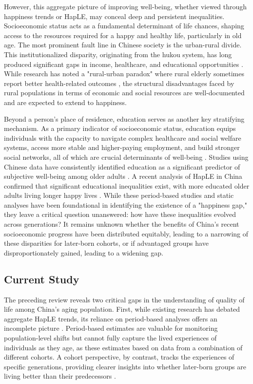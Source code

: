 \documentclass[12pt, a4paper]{article}
\begin{document}
However, this aggregate picture of improving well-being, whether viewed through happiness trends or HapLE, may conceal deep and persistent inequalities. Socioeconomic status acts as a fundamental determinant of life chances, shaping access to the resources required for a happy and healthy life, particularly in old age. The most prominent fault line in Chinese society is the urban-rural divide. This institutionalized disparity, originating from the hukou system, has long produced significant gaps in income, healthcare, and educational opportunities \autocite{guo.2024.regional,liu.2019.are}. While research has noted a "rural-urban paradox" where rural elderly sometimes report better health-related outcomes \autocite{jiao.2019.inequality,zhang.2022.trends}, the structural disadvantages faced by rural populations in terms of economic and social resources are well-documented \autocite{wang.2020.gap} and are expected to extend to happiness.

Beyond a person's place of residence, education serves as another key stratifying mechanism. As a primary indicator of socioeconomic status, education equips individuals with the capacity to navigate complex healthcare and social welfare systems, access more stable and higher-paying employment, and build stronger social networks, all of which are crucial determinants of well-being \autocite{payne.2022.expansion}. Studies using Chinese data have consistently identified education as a significant predictor of subjective well-being among older adults \autocite{cheng.2021.sociodemographic}. A recent analysis of HapLE in China confirmed that significant educational inequalities exist, with more educated older adults living longer happy lives \autocite{wan.2024.socioeconomic}. While these period-based studies and static analyses have been foundational in identifying the existence of a "happiness gap," they leave a critical question unanswered: how have these inequalities evolved across generations? It remains unknown whether the benefits of China’s recent socioeconomic progress have been distributed equitably, leading to a narrowing of these disparities for later-born cohorts, or if advantaged groups have disproportionately gained, leading to a widening gap.

\subsection{Current Study}
The preceding review reveals two critical gaps in the understanding of quality of life among China's aging population. First, while existing research has debated aggregate HapLE trends, its reliance on period-based analyses offers an incomplete picture \autocite{duan.2020.happy}. Period-based estimates are valuable for monitoring population-level shifts but cannot fully capture the lived experiences of individuals as they age, as these estimates based on data from a combination of different cohorts. A cohort perspective, by contrast, tracks the experiences of specific generations, providing clearer insights into whether later-born groups are living better than their predecessors \autocite{payne.2022.expansion}.
\end{document}
